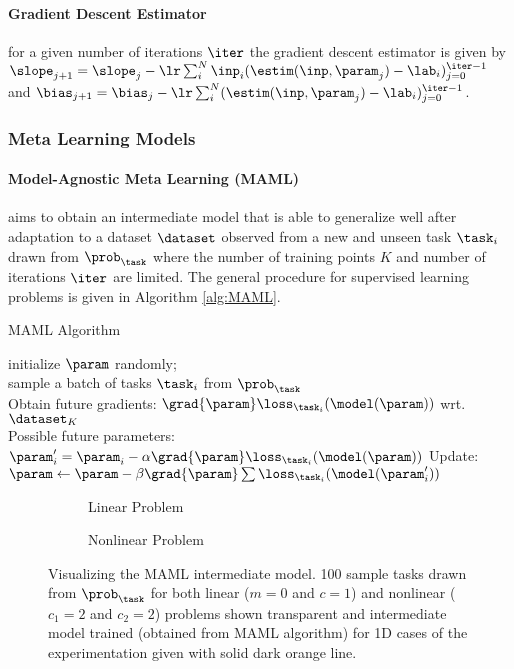 \paragraph{Gradient Descent Estimator} for a given number of iterations $\iter$ the gradient descent estimator is given by $\slope_{j+1}=\slope_{j} - \lr\sum_i^{N}\inp_i(\estim(\inp,\param_j)-\lab_i)_{j=0}^{\iter-1}$ and $\bias_{j+1}=\bias_{j} - \lr\sum_i^{N}(\estim(\inp,\param_j)-\lab_i)_{j=0}^{\iter-1}$.

\subsubsection{Meta Learning Models}

\paragraph{Model-Agnostic Meta Learning (MAML)} aims to obtain an intermediate model that is able to generalize well after adaptation to a dataset $\dataset$ observed from a new and unseen task $\task_i$ drawn from $\prob_\task$ where the number of training points $K$ and number of iterations $\iter$ are limited. The general procedure for supervised learning problems is given in Algorithm \ref{alg:MAML}.

\begin{algorithm}
  \caption{MAML\cite{Finn2017} Algorithm}\label{alg:MAML}
  \KwData{$\prob_{\task}$, $\alpha$, $\beta$}
  initialize $\param$ randomly; \\
  {
    sample a batch of tasks $\task_i$ from $\prob_{\task}$\\
    {
      Obtain future gradients: $\grad{\param}\loss_{\task_i}(\model(\param))$ wrt. $\dataset_K$ \\
      Possible future parameters: $\param_i^\prime = \param_i -\alpha\grad{\param}\loss_{\task_i}(\model(\param))$
    }
    Update: $\param \leftarrow \param- \beta\grad{\param}\sum\loss_{\task_i}(\model(\param_i^\prime))$
  }
\end{algorithm}

\begin{figure}[ht!]
  \centering
  \begin{subfigure}[b]{0.49\textwidth}
    \centering
    \caption{Linear Problem}
    \label{fig:lin_maml}
  \end{subfigure}
  \begin{subfigure}[b]{0.49\textwidth}
    \centering
    \caption{Nonlinear Problem}
    \label{fig:nonlin_maml}
  \end{subfigure}
  \caption{Visualizing the MAML intermediate model. 100 sample tasks drawn from $\prob_\task$ for both linear ($m=0$ and $c=1$) and nonlinear ($c_1=2$ and $c_2=2$) problems shown transparent and intermediate model trained (obtained from MAML algorithm) for 1D cases of the experimentation given with solid dark orange line.}
\end{figure}


